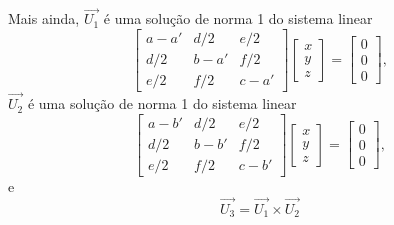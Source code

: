 \begin{teorema}
    Mais ainda, $\vec{U_1}$ é uma solução de norma 1 do sistema linear
    \[
        \begin{bmatrix}
            a - a' & d/2    & e/2    \\
            d/2    & b - a' & f/2    \\
            e/2    & f/2    & c - a'
        \end{bmatrix} \begin{bmatrix}
            x \\y\\z
        \end{bmatrix} = \begin{bmatrix}
            0 \\0\\0
        \end{bmatrix},
    \]
    $\vec{U_2}$ é uma solução de norma 1 do sistema linear
    \[
        \begin{bmatrix}
            a - b' & d/2    & e/2    \\
            d/2    & b - b' & f/2    \\
            e/2    & f/2    & c - b'
        \end{bmatrix} \begin{bmatrix}
            x \\y\\z
        \end{bmatrix} = \begin{bmatrix}
            0 \\0\\0
        \end{bmatrix},
    \]
    e
    \[
        \vec{U_3} = \vec{U_1} \times \vec{U_2}
    \]
\end{teorema}

